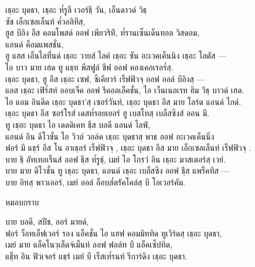 \begin{leader}
\end{leader}

\begin{thaitrans}
เธฺอะ บุดธา, เธฺอะ ท๎รูลี เวอร์ธฺี วัน, เอ็นดาวด์ วิธฺ\\
\vin ซัช เอ็กเซลเล็นท์ ค๎วอลิทีสฺ,\\
ฮูส บีอิง อีส คอมโพสด์ ออฟ เพียวริที, ท๎รานเซ็นเด็นทอล วิสดอม,\\
\vin แอนด์ ค็อมแพสชั่น,\\
ฮู แฮส เอ็นไลทึ่นด์ เธฺอะ วายส์ ไลค์ เธฺอะ ซัน อะเวคเค็นนิง เธฺอะ โลตัส —\\
ไอ บาว มาย เฮด ทู แธฺท พีสฟูล์ ชีฟ ออฟ คองเคอเรอร๎สฺ.\\
เธฺอะ บุดธา, ฮู อีส เธฺอะ เซฟ, ซีเคียวร์ เร็ฟฟิวจฺ  ออฟ ออล์ บีอิงสฺ —\\
แอส เธฺอะ เฟิร๎สท์ ออบเจ็ค ออฟ รีคอลเล็คชั่น, ไอ เว็นเนอเรท ฮิม วิธฺ บาวด์ เฮด.\\
ไอ แอม อินดีด เธฺอะ บุดธา’สฺ เซอร์วันท์, เธฺอะ บุดธา อีส มาย โลร์ด แอนด์ ไกด์.\\
เธฺอะ บุดธา อีส ซอร์โรส์ เดสท๎รอยเยอร์ ฮู   เบสโทสฺ  เบล็สซิงส์ ออน มี.\\
ทู เธฺอะ บุดธา ไอ เดดดิเคท ธฺีส บอดี แอนด์ ไลฟ์,\\
แอนด์ อิน ดีโวชั่น ไอ วิวล์ วอล์ค เธฺอะ บุดธาสฺ  พาธ ออฟ อะเวคเค็นนิ่ง\\
ฟอร์ มี แธฺร์ อีส โน อาเธฺอร์ เร็ฟฟิวจฺ , เธฺอะ บุดธา อีส มาย เอ็กเซลเล็นท์ เร็ฟฟิวจฺ .\\
บาย ธฺิ อัทเทอเร็นส์ ออฟ ธฺีส ท๎รูธฺ์, เมย์ ไอ โกรว์ อิน เธฺอะ มาสเตอร์สฺ  เวย์.\\
บาย มาย ดีโวชั่น ทู เธฺอะ บุดธา, แอนด์ เธฺอะ เบล็สซิง ออฟ ธฺีส แพร็คทิส —\\
บาย อิทสฺ  พาวเออร์, เมย์ ออล์ อ็อบส๎ตรัคโคล์สฺ บี โอเวอร์คัม.\\
\end{thaitrans}

\begin{instruction}
หมอบกราบ
\end{instruction}

\begin{thaitrans}
บาย บอดี, สปีช, ออร์ มายด์,\\
ฟอร์ ว็อทเอ็ฟเวอร์ รอง แอ็คชั่น ไอ แฮฟ คอมมิททิด ทูเวิร์ดสฺ  เธฺอะ บุดธา,\\
เมย์ มาย แอ็คโนวฺเล็ดจ์เม็นท์ ออฟ ฟอล์ท บี แอ็คเซ็ปทิด,\\
แธฺ็ท อิน ฟิวเจอร์ แธฺร์ เมย์ บี เร็สเท๎รนท์ รีการ์ดิง เธฺอะ บุดธา.\\
\end{thaitrans}
\clearpage
